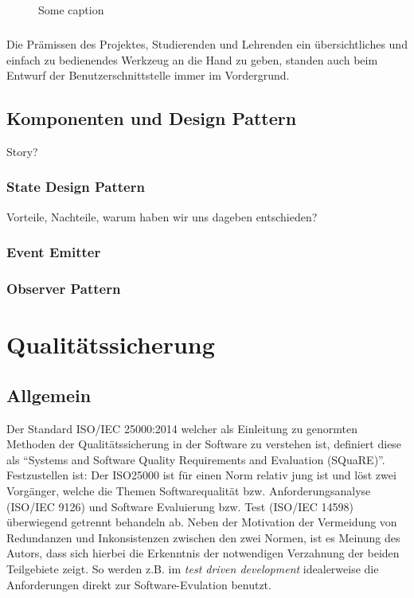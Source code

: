 \begin{figure}[h]
	\centering
	\caption{Some caption}
	\label{UI_final}
\end{figure}

\paragraph{}Die Prämissen des Projektes, Studierenden und Lehrenden ein übersichtliches und einfach zu bedienendes Werkzeug an die Hand zu geben, standen auch beim Entwurf der Benutzerschnittstelle immer im Vordergrund.

\section{Komponenten und Design Pattern}
Story? 

\subsection*{State Design Pattern}
Vorteile, Nachteile, warum haben wir uns dageben entschieden?

\subsection*{Event Emitter}
\subsection*{Observer Pattern}


\chapter{Qualitätssicherung}
\label{QS}
\section{Allgemein}
Der Standard ISO/IEC 25000:2014 welcher als Einleitung zu genormten Methoden der Qualitätssicherung in der Software zu verstehen ist, definiert diese als "`Systems and Software Quality Requirements and Evaluation (SQuaRE)"'\cite[Foreword]{ISO25000}. Festzustellen ist: Der ISO25000 ist für einen Norm relativ jung ist und löst zwei Vorgänger, welche die Themen Softwarequalität bzw. Anforderungsanalyse (ISO/IEC 9126) und Software Evaluierung bzw. Test (ISO/IEC 14598) überwiegend getrennt behandeln ab. Neben der Motivation der Vermeidung von Redundanzen und Inkonsistenzen zwischen den zwei Normen, ist es Meinung des Autors, dass sich hierbei die Erkenntnis der notwendigen Verzahnung der beiden Teilgebiete zeigt. So werden z.B. im \textit{test driven development} idealerweise die Anforderungen direkt zur Software-Evulation benutzt.

